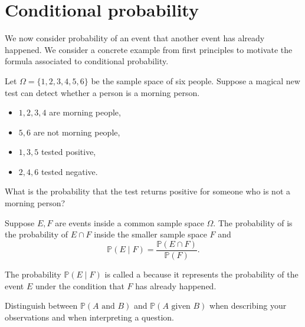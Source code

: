 \documentclass[../main.tex]{subfiles}
\begin{document}
 \section{Conditional probability}

We now consider probability of an event  that another event has already happened.   We consider a concrete example from first principles  to motivate the formula associated to conditional probability.

\begin{example} \label{ex:probability-conditional-motivation}
  Let \(\Omega = \{1,2,3,4,5,6\}\) be the sample space of six people.  Suppose a magical new test can detect whether a person is a morning person.
  \begin{itemize}
    \item \(1,2,3,4\) are morning people,
    \item \(5,6\) are not morning people,
    \item \(1,3,5\) tested positive,
    \item \(2,4,6\) tested negative.
  \end{itemize}

  What is the probability that the test returns positive for someone who is not a morning person?

\end{example}

\begin{definition} \label{def:conditional-probability}
  Suppose \(E,F\) are events inside a common sample space \(\Omega\).  The probability of  is the probability of \(E \cap F\) inside the smaller sample space \(F\) and
  \begin{equation} \label{eq:conditional}
    \mathbb{P}( E \mid F ) = \frac{\mathbb{P}(E \cap F)}{\mathbb{P}(F)}.
  \end{equation}

  The probability \(\mathbb{P}( E \mid F )\) is called a  because it represents the probability of the event \(E\) under the condition that \(F\) has already happened.
\end{definition}
\faExclamationTriangle{} Distinguish between \(\mathbb{P}(A \text{ and } B)\) and \(\mathbb{P}(A \text{ given } B)\) when describing your observations and when interpreting a question.
\clearpage
\end{document}
